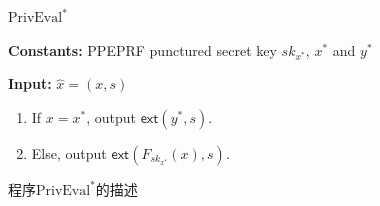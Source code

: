 \begin{figure}[!hbth]
\begin{framed}
\begin{minipage}[center]{\textwidth}
\begin{center}
    $\text{PrivEval}^*$ 
\end{center}
\vspace{-1em}
\begin{trivlist}
    \item \textbf{Constants:} PPEPRF punctured secret key $sk_{x^*}$, $x^*$ and $y^*$
    
    \item \textbf{Input:} $\hat{x} = (x, s)$ 
        \begin{enumerate}\itemsep 1pt \parskip 0pt \parsep 0pt
            \item If $x = x^*$, output $\mathsf{ext}(y^*, s)$. 
            \item Else, output $\mathsf{ext}(F_{sk_{x^*}}(x), s)$. 
        \end{enumerate}
\end{trivlist}
\end{minipage}
\end{framed}
\caption{程序$\text{PrivEval}^*$的描述}
\label{fig:ch5-PPEPRF-PrivEval-star}
\end{figure}

